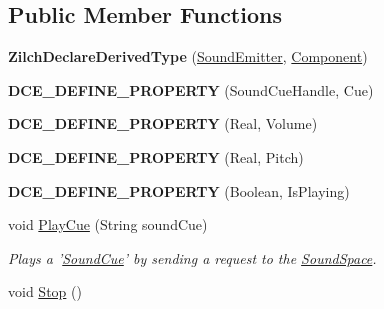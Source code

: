 \subsection*{Public Member Functions}
\begin{DoxyCompactItemize}
\item 
\hypertarget{classDCEngine_1_1Components_1_1SoundEmitter_a05447df115a42d3d05a82d980b852ed8}{{\bfseries Zilch\-Declare\-Derived\-Type} (\hyperlink{classDCEngine_1_1Components_1_1SoundEmitter}{Sound\-Emitter}, \hyperlink{classDCEngine_1_1Component}{Component})}\label{classDCEngine_1_1Components_1_1SoundEmitter_a05447df115a42d3d05a82d980b852ed8}

\item 
\hypertarget{classDCEngine_1_1Components_1_1SoundEmitter_a5b01d8d1662ac0bfba529f660ef0f181}{{\bfseries D\-C\-E\-\_\-\-D\-E\-F\-I\-N\-E\-\_\-\-P\-R\-O\-P\-E\-R\-T\-Y} (Sound\-Cue\-Handle, Cue)}\label{classDCEngine_1_1Components_1_1SoundEmitter_a5b01d8d1662ac0bfba529f660ef0f181}

\item 
\hypertarget{classDCEngine_1_1Components_1_1SoundEmitter_a16e565a89930c1c37c057ed572df6a27}{{\bfseries D\-C\-E\-\_\-\-D\-E\-F\-I\-N\-E\-\_\-\-P\-R\-O\-P\-E\-R\-T\-Y} (Real, Volume)}\label{classDCEngine_1_1Components_1_1SoundEmitter_a16e565a89930c1c37c057ed572df6a27}

\item 
\hypertarget{classDCEngine_1_1Components_1_1SoundEmitter_ac0384914c687eee0d59eea610e98cb3b}{{\bfseries D\-C\-E\-\_\-\-D\-E\-F\-I\-N\-E\-\_\-\-P\-R\-O\-P\-E\-R\-T\-Y} (Real, Pitch)}\label{classDCEngine_1_1Components_1_1SoundEmitter_ac0384914c687eee0d59eea610e98cb3b}

\item 
\hypertarget{classDCEngine_1_1Components_1_1SoundEmitter_ae9d87fe38cb78fcfd6d1c4d50d50b9f1}{{\bfseries D\-C\-E\-\_\-\-D\-E\-F\-I\-N\-E\-\_\-\-P\-R\-O\-P\-E\-R\-T\-Y} (Boolean, Is\-Playing)}\label{classDCEngine_1_1Components_1_1SoundEmitter_ae9d87fe38cb78fcfd6d1c4d50d50b9f1}

\item 
void \hyperlink{classDCEngine_1_1Components_1_1SoundEmitter_a0a5f626c00b84e167cfe7c95192d95af}{Play\-Cue} (String sound\-Cue)
\begin{DoxyCompactList}\small\item\em Plays a '\hyperlink{classDCEngine_1_1SoundCue}{Sound\-Cue}' by sending a request to the \hyperlink{classDCEngine_1_1Components_1_1SoundSpace}{Sound\-Space}. \end{DoxyCompactList}\item 
\hypertarget{classDCEngine_1_1Components_1_1SoundEmitter_ab29f1e839e30ea83b3dc4609f2d706de}{void \hyperlink{classDCEngine_1_1Components_1_1SoundEmitter_ab29f1e839e30ea83b3dc4609f2d706de}{Stop} ()}\label{classDCEngine_1_1Components_1_1SoundEmitter_ab29f1e839e30ea83b3dc4609f2d706de}


\end{DoxyCompactItemize}
